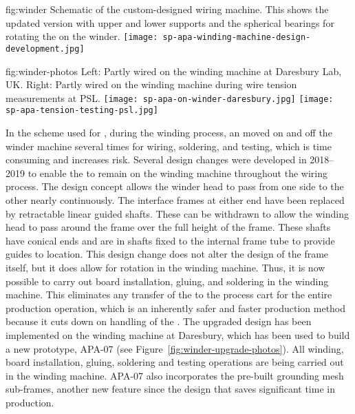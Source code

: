 \begin{dunefigure}{fig:winder}
{Schematic of the custom-designed  wiring machine.  This shows the updated version with upper and lower supports and the spherical bearings for rotating the  on the winder.}
\texttt{[image: sp-apa-winding-machine-design-development.jpg]} 
\end{dunefigure}

\begin{dunefigure}{fig:winder-photos}
{Left: Partly wired   on the winding machine at Daresbury Lab, UK. Right: Partly wired   on the winding machine during wire tension measurements at PSL.}
\texttt{[image: sp-apa-on-winder-daresbury.jpg]}
\texttt{[image: sp-apa-tension-testing-psl.jpg]}
\end{dunefigure}

In the scheme used for , during the winding process, an  moved on and off the winder machine several times for wiring, soldering, and testing, which is time consuming and increases risk.  Several design changes were developed in 2018--2019 to enable the  to remain on the winding machine throughout the wiring process. The design concept allows the winder head to pass from one side to the other nearly continuously. The interface frames at either end have been replaced by retractable linear guided shafts. These can be withdrawn to allow the winding head to pass around the frame over the full height of the frame. These shafts have conical ends and are in shafts fixed to the internal frame tube to provide guides to location. This design change does not alter the design of the frame itself, but it does allow for rotation in the winding machine. Thus, it is now possible to carry out board installation, gluing, and soldering in the winding machine. This eliminates any transfer of the  to the process cart for the entire production operation, which is an inherently safer and faster production method because it cuts down on handling of the .  The upgraded design has been implemented on the winding machine at Daresbury, which has been used to build a new prototype, APA-07 (see Figure~\ref{fig:winder-upgrade-photos}). All winding, board installation, gluing, soldering and testing operations are being carried out in the winding machine. APA-07 also incorporates the pre-built grounding mesh sub-frames, another new feature since the  design that saves significant time in production.  

